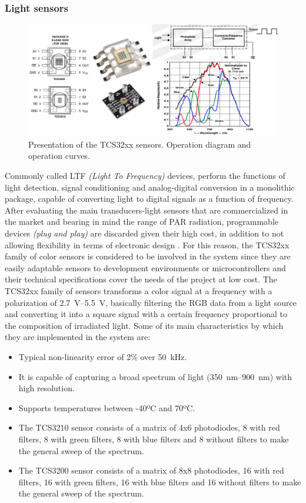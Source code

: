 \documentclass[letterpaper,12pt,twoside]{articleingud}
\begin{document}
\subsubsection{Light sensors}
\begin{figure}
 \begin{center}
  \includegraphics[width=16cm]{images/sensorLuzColor.png}
   \caption{Presentation of the TCS32xx sensors. Operation diagram and operation curves.\cite{tcs3200} } \end{center}
\end{figure}
Commonly called LTF \textit{(Light To Frequency)} devices, perform the functions of light detection, signal conditioning and analog-digital conversion in a monolithic package, capable of converting light to digital signals as a function of frequency. After evaluating the main transducers-light sensors that are commercialized in the market and bearing in mind the range of PAR radiation, programmable devices \textit{(plug and play)} are discarded given their high cost, in addition to not allowing flexibility in terms of electronic design . For this reason, the TCS32xx family of color sensors is considered to be involved in the system since they are easily adaptable sensors to development environments or microcontrollers and their technical specifications cover the needs of the project at low cost. The TCS32xx family of sensors transforms a color signal at a frequency with a polarization of \SIrange{2.7}{5.5}{\volt}, basically filtering the RGB data from a light source and converting it into a square signal with a certain frequency proportional to the composition of irradiated light. Some of its main characteristics by which they are implemented in the system are:
\begin{itemize}
    \item Typical non-linearity error of $2\%$ over \SI{50}{\kilo\hertz}.
    \item It is capable of capturing a broad spectrum of light (\SIrange{350}{900}{\nano\metre}) with high resolution.
    \item Supports temperatures between -40ºC and 70ºC.
    \item The TCS3210 sensor consists of a matrix of 4x6 photodiodes, 8 with red filters, 8 with green filters, 8 with blue filters and 8 without filters to make the general sweep of the spectrum.
    \item The TCS3200 sensor consists of a matrix of 8x8 photodiodes, 16 with red filters, 16 with green filters, 16 with blue filters and 16 without filters to make the general sweep of the spectrum.
\end{itemize}
\end{document}
